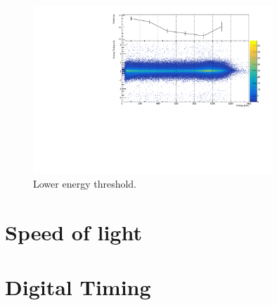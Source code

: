 \documentclass[a4paper,11pt]{article}
\begin{document}
\begin{figure}[h!]
\centering
\includegraphics[width = 0.8\textwidth]{ThresholdTAC_FWHMvs2Ddist}
\caption{Lower energy threshold.}
\label{Fig: lower energy thr}
\end{figure}



\section*{Speed of light}

\section*{Digital Timing}
\end{document}
